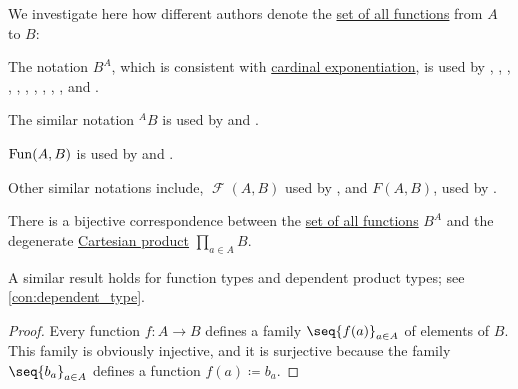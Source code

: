 \begin{remark}\label{rem:set_of_all_functions_notation}
  We investigate here how different authors denote the \hyperref[def:set_of_all_functions]{set of all functions} from \( A \) to \( B \):
  \begin{thmenum}
     The notation \( B^A \), which is consistent with \hyperref[def:cardinal_arithmetic/exponentiation]{cardinal exponentiation}, is used by
    ,
    ,
    ,
    ,
    ,
    ,
    ,
    ,
    ,
    ,
     and
    .

    The similar notation \( {}^A B \) is used by
     and
    .

     \( \op{Fun}(A, B) \) is used by
     and
    .

    Other similar notations include, \( \mscrF(A, B) \) used by , and \( F(A, B) \), used by .
  \end{thmenum}
\end{remark}

\begin{proposition}\label{thm:set_of_all_functions_via_cartesian_product}
  There is a bijective correspondence between the \hyperref[def:set_of_all_functions]{set of all functions} \( B^A \) and the degenerate \hyperref[def:cartesian_product]{Cartesian product} \( \prod_{a \in A} B \).
\end{proposition}
\begin{comments}
  \item A similar result holds for function types and dependent product types; see \cref{con:dependent_type}.
\end{comments}
\begin{proof}
  Every function \( f: A \to B \) defines a family \( \seq{ f(a) }_{a \in A} \) of elements of \( B \). This family is obviously injective, and it is surjective because the family \( \seq{ b_a }_{a \in A} \) defines a function \( f(a) \coloneqq b_a \).
\end{proof}

